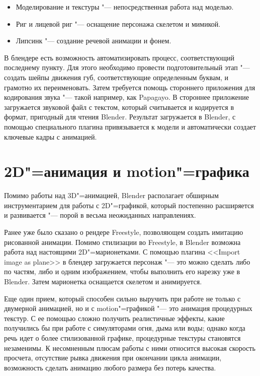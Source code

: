 \documentclass[10pt, a5paper]{article}
\begin{document}
\begin{itemize}
  \item Моделирование и текстуры "--- непосредственная работа над моделью.
  \item Риг и лицевой риг "--- оснащение персонажа скелетом и мимикой.
  \item Липсинк "--- создание речевой анимации и фонем.
\end{itemize}

В блендере есть возможность автоматизировать процесс, соответствующий последнему пункту. Для этого необходимо провести подготовительный этап "--- создать шейпы движения губ, соответствующие определенным буквам, и грамотно их переименовать. Затем требуется помощь стороннего приложения для кодирования звука "--- такой например, как Papagayo. В стороннее приложение загружается звуковой файл с текстом, который считывается и кодируется в формат, пригодный для чтения Blender. Результат загружается в Blender, с помощью специального плагина привязывается к модели и автоматически создает ключевые кадры с анимацией.

\section*{2D"=анимация и motion"=графика}

Помимо работы над 3D"=анимацией, Blender располагает обширным инструментарием для работы с 2D"=графикой, который постепенно расширяется и развивается "--- порой в весьма неожиданных направлениях.

Ранее уже было сказано о рендере Freestyle, позволяющем создать имитацию рисованной анимации.  Помимо стилизации во \linebreak Freestyle, в Blender возможна работа над настоящими 2D"=марионетками. С помощью плагина <<Import image as plane>> в блендер загружается персонаж "--- это можно сделать либо по частям, либо и одним изображением, чтобы выполнить его нарезку уже в Blender. Затем марионетка оснащается скелетом и анимируется.

Еще один прием, который способен сильно выручить при работе не только с двумерной анимацией, но и с motion"=графикой "--- это анимация процедурных текстур. С ее помощью сложно получить реалистичные эффекты, какие получились бы при работе с симуляторами огня, дыма или воды; однако когда речь идет о более стилизованной графике,  процедурные текстуры становятся незаменимы. К несомненным плюсам работы с ними относится высокая скорость просчета, отсутствие рывка движения при окончании цикла анимации, возможность сделать анимацию любого размера без потерь качества.
\end{document}

